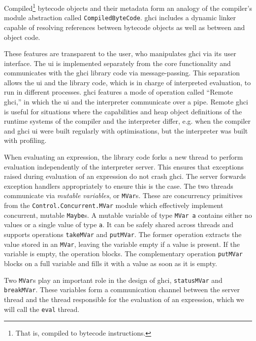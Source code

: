 \documentclass[thesis=B,english]{FITthesis}[2019/12/23]
\newcommand{\hsType}[1]{\texttt{#1}}
\newcommand{\hsIdent}[1]{\texttt{#1}}
\newcommand{\hsModule}[1]{\texttt{#1}}
\begin{document}
Compiled\footnote{That is, compiled to bytecode instructions.} bytecode objects
and their metadata form an analogy of the compiler's module abstraction called
\hsType{CompiledByteCode}. \acrshort{ghci} includes a dynamic linker capable of
resolving references between bytecode objects as well as between
 and object code.

These features are transparent to the user, who manipulates \acrshort{ghci} via
its user interface. The \acrshort{ui} is implemented separately from the core
functionality and communicates with the \acrshort{ghci} library code via
message-passing. This separation allows the \acrshort{ui} and the library code,
which is in charge of interpreted evaluation, to run in different processes.
\acrshort{ghci} features a mode of operation called ``Remote \acrshort{ghci},''
in which the \acrshort{ui} and the interpreter communicate over a pipe. Remote
\acrshort{ghci} is useful for situations where the capabilities and heap object
definitions of the runtime systems of the compiler and the interpreter differ,
e.g. when the compiler and \acrshort{ghci} \acrshort{ui} were built regularly
with optimisations, but the interpreter was built with profiling.

When evaluating an expression, the library code forks a new thread to perform
evaluation independently of the interpreter server. This ensures that
exceptions raised during evaluation of an expression do not crash
\acrshort{ghci}. The server forwards exception handlers appropriately to ensure
this is the case. The two threads communicate via \textit{mutable variables},
or \hsType{MVar}s. These are concurrency primitives from the
\hsModule{Control.Concurrent.MVar} module which effectively implement
concurrent, mutable \hsType{Maybe}s\cite{concurrent-haskell}. A mutable
variable of type \hsType{MVar a} contains either no values or a single value of
type \hsType{a}. It can be safely shared across threads and supports
operations \hsIdent{takeMVar} and \hsIdent{putMVar}. The former operation
extracts the value stored in an \hsType{MVar}, leaving the variable empty if a
value is present. If the variable is empty, the operation blocks. The
complementary operation \hsIdent{putMVar} blocks on a full variable and fills
it with a value as soon as it is empty.

Two \hsType{MVar}s play an important role in the design of \acrshort{ghci},
\hsIdent{statusMVar} and \hsIdent{breakMVar}. These variables form a
communication channel between the server thread and the thread responsible for
the evaluation of an expression, which we will call the \texttt{eval} thread.
\end{document}
